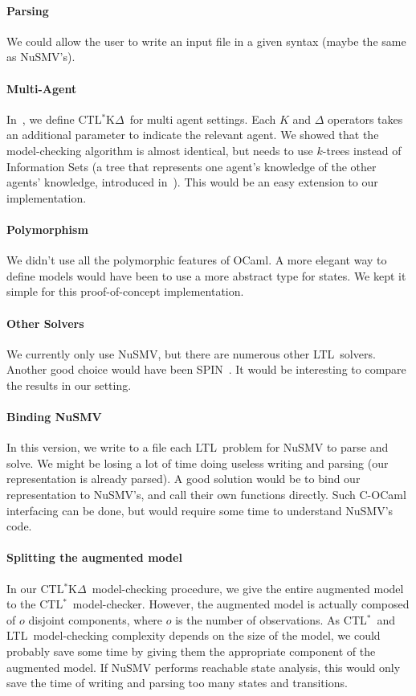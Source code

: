 \documentclass[dvipsnames]{acmart}
\def\ctls{CTL$^{*}$}
\def\ctlskd{CTL$^{*}$K$\Delta$}
\def\ltl{LTL}
\def\K{\mathit{K}}
\begin{document}
\paragraph{Parsing}
We could allow the user to write an input file in a given syntax (maybe the same as NuSMV's).

\paragraph{Multi-Agent}
In~\cite{KR18}, we define \ctlskd\ for multi agent settings. Each $\K$ and $\Delta$ operators takes an additional parameter to indicate the relevant agent.
We showed that the model-checking algorithm is almost identical, but needs to use $k$-trees instead of Information Sets (a tree that represents one agent's knowledge of the other agents' knowledge, introduced in~\cite{ktrees}).
This would be an easy extension to our implementation.

\paragraph{Polymorphism}
We didn't use all the polymorphic features of OCaml. A more elegant way to define models would have been to use a more abstract type for states. We kept it simple for this proof-of-concept implementation.

\paragraph{Other Solvers}
We currently only use NuSMV, but there are numerous other \ltl\ solvers. Another good choice would have been SPIN~\cite{spin}.
It would be interesting to compare the results in our setting.

\paragraph{Binding NuSMV}
In this version, we write to a file each \ltl\ problem for NuSMV to parse and solve. We might be losing a lot of time doing useless writing and parsing (our representation is already parsed). A good solution would be to bind our representation to NuSMV's, and call their own functions directly. Such C-OCaml interfacing can be done, but would require some time to understand NuSMV's code.

\paragraph{Splitting the augmented model}
In our \ctlskd\ model-checking procedure, we give the entire augmented model to the \ctls\ model-checker.
However, the augmented model is actually composed of $o$ disjoint components, where $o$ is the number of observations.
As \ctls\ and \ltl\ model-checking complexity depends on the size of the model, we could probably save some time by giving them the appropriate component of the augmented model. If NuSMV performs reachable state analysis, this would only save the time of writing and parsing too many states and transitions.
\end{document}
